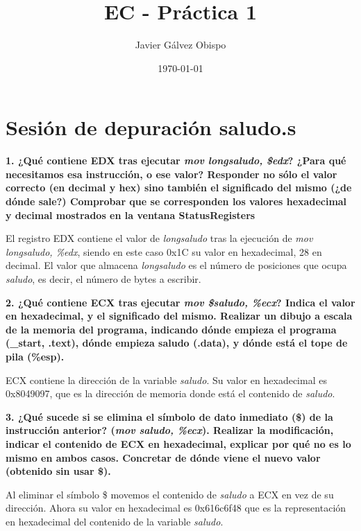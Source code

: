 \documentclass{article}
\begin{document}
\title{\Huge EC - Práctica 1}
\author{\Large Javier Gálvez Obispo}
\date{\large\today}
\maketitle

\section{Sesión de depuración saludo.s}

  \begin{flushleft}
    \textbf{1. ¿Qué contiene EDX tras ejecutar \textit{mov longsaludo, \$edx}?
    ¿Para qué necesitamos esa instrucción, o ese valor? Responder no sólo el valor correcto
    (en decimal y hex) sino también el significado del mismo (¿de dónde sale?)
    Comprobar que se corresponden los valores hexadecimal y decimal mostrados en la ventana
    Status\textrightarrow Registers } \break

    El registro EDX contiene el valor de \textit{longsaludo} tras la ejecución de \textit{mov longsaludo, \%edx},
    siendo en este caso 0x1C su valor en hexadecimal, 28 en decimal. El valor que almacena \textit{longsaludo}
    es el número de posiciones que ocupa \textit{saludo}, es decir, el número de bytes a escribir.
  \end{flushleft}

  \begin{flushleft}
    \textbf{2. ¿Qué contiene ECX tras ejecutar \textit{mov \$saludo, \%ecx}?
    Indica el valor en hexadecimal, y el significado del mismo.
    Realizar un dibujo a escala de la memoria del programa, indicando dónde empieza
    el programa (\_start, .text), dónde empieza saludo (.data), y dónde está el tope
     de pila (\%esp).} \break

    ECX contiene la dirección de la variable \textit{saludo}. Su valor en hexadecimal es 0x8049097,
    que es la dirección de memoria donde está el contenido de \textit{saludo}.
  \end{flushleft}

  \begin{flushleft}
    \textbf{3. ¿Qué sucede si se elimina el símbolo de dato inmediato (\$) de la
    instrucción anterior? (\textit{mov saludo, \%ecx}). Realizar la modificación, indicar el
    contenido de ECX en hexadecimal, explicar por qué no es lo mismo en ambos casos.
    Concretar de dónde viene el nuevo valor (obtenido sin usar \$).} \break

    Al eliminar el símbolo \$ movemos el contenido de \textit{saludo} a ECX en vez de su dirección.
    Ahora su valor en hexadecimal es 0x616c6f48 que es la representación en hexadecimal del
    contenido de la variable \textit{saludo}.
  \end{flushleft}
\end{document}
